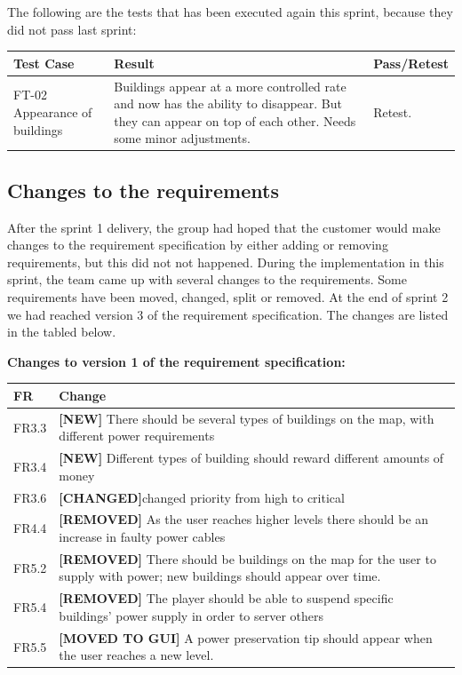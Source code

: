 	The following are the tests that has been executed again this sprint, because they did not pass last sprint:

	\begin{tabular}{| p{3cm} | p{7cm} | p{2cm} |}
		\hline
		\rowcolor{lightgray}
		{\bf Test Case} & {\bf Result} & {\bf Pass/Retest} \\ \hline

		FT-02 Appearance of buildings & Buildings appear at a more controlled rate and now has the ability to disappear. But they can appear on top of each other. Needs some minor adjustments. & Retest. \\ \hline

	\end{tabular}

\subsection{Changes to the requirements}
	
	After the sprint 1 delivery, the group had hoped that the customer would make 
	changes to the requirement specification by either adding or removing requirements, 
	but this did not not happened. During the implementation in this sprint, the 
	team came up with several changes to the requirements. Some requirements have been moved, 
	changed, split or removed. At the end of sprint 2 we had reached version 3 of the requirement 
	specification. The changes are listed in the tabled below.


	{\bf Changes to version 1 of the requirement specification:} \\
	\begin{tabular}{| p{1.5cm} | p{12cm} |}
		\hline
		\rowcolor{lightgray}
		{\bf FR} & {\bf Change} \\ \hline
		FR3.3 & {\bf \color{green} [NEW]} There should be several types of buildings on the map, 
		with different power requirements  \\ \hline
		FR3.4 & {\bf \color{green} [NEW]} Different types of building should reward different amounts of 
		money \\ \hline
		FR3.6 & {\bf \color{orange} [CHANGED]}changed priority from high to critical \\ \hline
		FR4.4 & {\bf \color{red} [REMOVED]} As the user reaches higher levels there should be an 
		increase in faulty power cables \\ \hline
		FR5.2 & {\bf \color{red} [REMOVED]} There should be buildings on the map for the user to 
		supply with power; new buildings should appear over time. \\ \hline
		FR5.4 & {\bf \color{red} [REMOVED]} The player should be able to suspend specific buildings' 
		power supply in order to server others \\ \hline
		FR5.5 & {\bf \color{orange} [MOVED TO GUI]} A power preservation tip should appear when the 
		user reaches a new level. \\ \hline
	\end{tabular}

